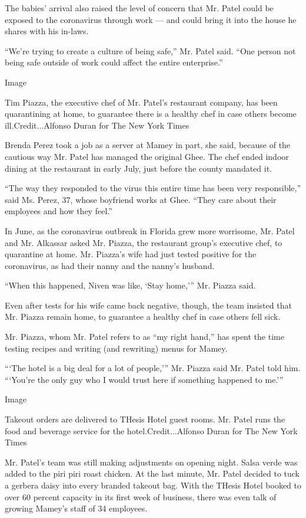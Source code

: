 The babies' arrival also raised the level of concern that Mr. Patel
could be exposed to the coronavirus through work --- and could bring it
into the house he shares with his in-laws.

``We're trying to create a culture of being safe,'' Mr. Patel said.
``One person not being safe outside of work could affect the entire
enterprise.''

Image

Tim Piazza, the executive chef of Mr. Patel's restaurant company, has
been quarantining at home, to guarantee there is a healthy chef in case
others become ill.Credit...Alfonso Duran for The New York Times

Brenda Perez took a job as a server at Mamey in part, she said, because
of the cautious way Mr. Patel has managed the original Ghee. The chef
ended indoor dining at the restaurant in early July, just before the
county mandated it.

``The way they responded to the virus this entire time has been very
responsible,'' said Ms. Perez, 37, whose boyfriend works at Ghee. ``They
care about their employees and how they feel.''

In June, as the coronavirus outbreak in Florida grew more worrisome, Mr.
Patel and Mr. Alkassar asked Mr. Piazza, the restaurant group's
executive chef, to quarantine at home. Mr. Piazza's wife had just tested
positive for the coronavirus, as had their nanny and the nanny's
husband.

``When this happened, Niven was like, `Stay home,''' Mr. Piazza said.

Even after tests for his wife came back negative, though, the team
insisted that Mr. Piazza remain home, to guarantee a healthy chef in
case others fell sick.

Mr. Piazza, whom Mr. Patel refers to as ``my right hand,'' has spent the
time testing recipes and writing (and rewriting) menus for Mamey.

```The hotel is a big deal for a lot of people,''' Mr. Piazza said Mr.
Patel told him. ```You're the only guy who I would trust here if
something happened to me.'''

Image

Takeout orders are delivered to THesis Hotel guest rooms. Mr. Patel runs
the food and beverage service for the hotel.Credit...Alfonso Duran for
The New York Times

Mr. Patel's team was still making adjustments on opening night. Salsa
verde was added to the piri piri roast chicken. At the last minute, Mr.
Patel decided to tuck a gerbera daisy into every branded takeout bag.
With the THesis Hotel booked to over 60 percent capacity in its first
week of business, there was even talk of growing Mamey's staff of 34
employees.

